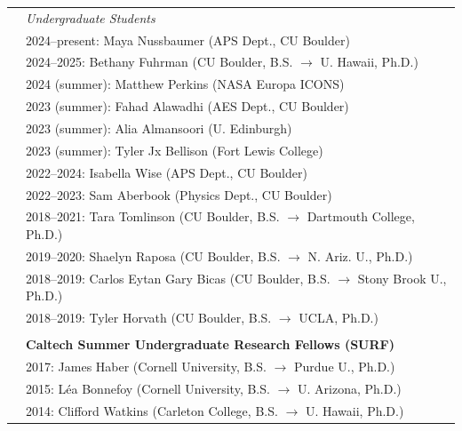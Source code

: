 \documentclass[letterpaper,10pt,twoside]{article}
\begin{document}
\begin{tabular}{@{} l l}
 & \textit{Undergraduate Students} \\
 & \hspace{0.25in} 2024--present: Maya Nussbaumer (APS Dept., CU Boulder) \\
 & \hspace{0.25in} 2024--2025: Bethany Fuhrman (CU Boulder, B.S. $\rightarrow$ U. Hawaii, Ph.D.) \\
 & \hspace{0.25in} 2024 (summer): Matthew Perkins (NASA Europa ICONS) \\
 & \hspace{0.25in} 2023 (summer): Fahad Alawadhi (AES Dept., CU Boulder) \\
 & \hspace{0.25in} 2023 (summer): Alia Almansoori (U. Edinburgh) \\
 & \hspace{0.25in} 2023 (summer): Tyler Jx Bellison (Fort Lewis College)\\ 
 & \hspace{0.25in} 2022--2024: Isabella Wise (APS Dept., CU Boulder) \\
 & \hspace{0.25in} 2022--2023: Sam Aberbook (Physics Dept., CU Boulder) \\
 & \hspace{0.25in} 2018--2021: Tara Tomlinson (CU Boulder, B.S. $\rightarrow$ Dartmouth College, Ph.D.) \\
 & \hspace{0.25in} 2019--2020: Shaelyn Raposa (CU Boulder, B.S. $\rightarrow$ N. Ariz. U., Ph.D.) \\
 & \hspace{0.25in} 2018--2019: Carlos Eytan Gary Bicas (CU Boulder, B.S. $\rightarrow$ Stony Brook U., Ph.D.) \\
 & \hspace{0.25in} 2018--2019: Tyler Horvath (CU Boulder, B.S. $\rightarrow$ UCLA, Ph.D.) \\
 & \\ 
 & \textbf{Caltech Summer Undergraduate Research Fellows (SURF)} \\
 & \hspace{0.25in} 2017: James Haber (Cornell University, B.S. $\rightarrow$ Purdue U., Ph.D.) \\
 & \hspace{0.25in} 2015: L{\'e}a Bonnefoy (Cornell University, B.S. $\rightarrow$ U. Arizona, Ph.D.) \\
 & \hspace{0.25in} 2014: Clifford Watkins (Carleton College, B.S. $\rightarrow$ U. Hawaii, Ph.D.) \\

\end{tabular}
\end{document}
